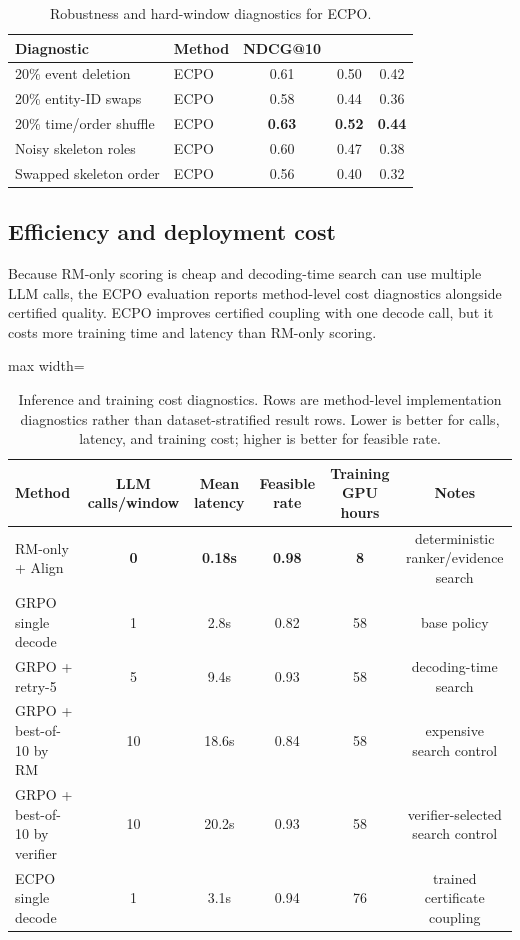 \documentclass{article}
\begin{document}
\begin{table}[h]
\centering
\caption{Robustness and hard-window diagnostics for ECPO.}
\label{tab:robustness_diagnostics}
\small
\begin{tabular}{l l c c c}
\toprule
Diagnostic & Method & NDCG@10 & \EvidCons@10 & \CertNDCG@10 \\
\midrule
20\% event deletion & ECPO & 0.61 & 0.50 & 0.42 \\
20\% entity-ID swaps & ECPO & 0.58 & 0.44 & 0.36 \\
20\% time/order shuffle & ECPO & \textbf{0.63} & \textbf{0.52} & \textbf{0.44} \\
Noisy skeleton roles & ECPO & 0.60 & 0.47 & 0.38 \\
Swapped skeleton order & ECPO & 0.56 & 0.40 & 0.32 \\
\bottomrule
\end{tabular}
\end{table}

\subsection{Efficiency and deployment cost}
\label{sec:app_efficiency}
Because RM-only scoring is cheap and decoding-time search can use multiple LLM calls, the ECPO evaluation reports method-level cost diagnostics alongside certified quality. ECPO improves certified coupling with one decode call, but it costs more training time and latency than RM-only scoring.

\begin{table}[h]
\centering
\caption{Inference and training cost diagnostics. Rows are method-level implementation diagnostics rather than dataset-stratified result rows. Lower is better for calls, latency, and training cost; higher is better for feasible rate.}
\label{tab:efficiency_cost}
\small
\begin{adjustbox}{max width=\linewidth}
\begin{tabular}{l c c c c c}
\toprule
Method & LLM calls/window & Mean latency & Feasible rate & Training GPU hours & Notes \\
\midrule
RM-only + Align & \textbf{0} & \textbf{0.18s} & \textbf{0.98} & \textbf{8} & deterministic ranker/evidence search \\
GRPO single decode & 1 & 2.8s & 0.82 & 58 & base policy \\
GRPO + retry-5 & 5 & 9.4s & 0.93 & 58 & decoding-time search \\
GRPO + best-of-10 by RM & 10 & 18.6s & 0.84 & 58 & expensive search control \\
GRPO + best-of-10 by verifier & 10 & 20.2s & 0.93 & 58 & verifier-selected search control \\
ECPO single decode & 1 & 3.1s & 0.94 & 76 & trained certificate coupling \\
\bottomrule
\end{tabular}
\end{adjustbox}
\end{table}
\end{document}
